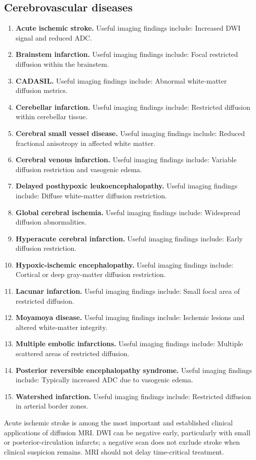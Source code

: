 \subsection{Cerebrovascular diseases}
\begin{enumerate}[leftmargin=*,itemsep=0.45em,topsep=0.4em]
\item \textbf{Acute ischemic stroke.} Useful imaging findings include: Increased DWI signal and reduced ADC.
\item \textbf{Brainstem infarction.} Useful imaging findings include: Focal restricted diffusion within the brainstem.
\item \textbf{CADASIL.} Useful imaging findings include: Abnormal white-matter diffusion metrics.
\item \textbf{Cerebellar infarction.} Useful imaging findings include: Restricted diffusion within cerebellar tissue.
\item \textbf{Cerebral small vessel disease.} Useful imaging findings include: Reduced fractional anisotropy in affected white matter.
\item \textbf{Cerebral venous infarction.} Useful imaging findings include: Variable diffusion restriction and vasogenic edema.
\item \textbf{Delayed posthypoxic leukoencephalopathy.} Useful imaging findings include: Diffuse white-matter diffusion restriction.
\item \textbf{Global cerebral ischemia.} Useful imaging findings include: Widespread diffusion abnormalities.
\item \textbf{Hyperacute cerebral infarction.} Useful imaging findings include: Early diffusion restriction.
\item \textbf{Hypoxic-ischemic encephalopathy.} Useful imaging findings include: Cortical or deep gray-matter diffusion restriction.
\item \textbf{Lacunar infarction.} Useful imaging findings include: Small focal area of restricted diffusion.
\item \textbf{Moyamoya disease.} Useful imaging findings include: Ischemic lesions and altered white-matter integrity.
\item \textbf{Multiple embolic infarctions.} Useful imaging findings include: Multiple scattered areas of restricted diffusion.
\item \textbf{Posterior reversible encephalopathy syndrome.} Useful imaging findings include: Typically increased ADC due to vasogenic edema.
\item \textbf{Watershed infarction.} Useful imaging findings include: Restricted diffusion in arterial border zones.
\end{enumerate}
Acute ischemic stroke is among the most important and established clinical applications of diffusion MRI. DWI can be negative early, particularly with small or posterior-circulation infarcts; a negative scan does not exclude stroke when clinical suspicion remains. MRI should not delay time-critical treatment.

